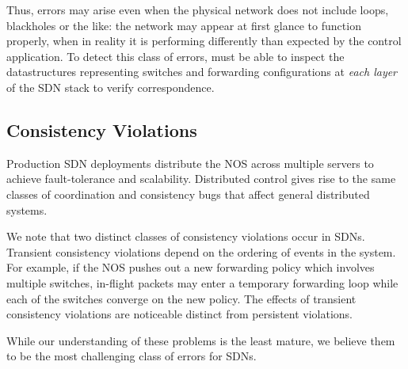 Thus, errors may arise even when the physical network does not include loops, blackholes or the like: the network
may appear at first glance to function properly, when in reality it is performing differently than expected by the control application.
To detect this class of errors, \projectname{} must be able to inspect the datastructures representing switches and forwarding configurations at {\it each layer} of the SDN stack to verify correspondence.

\subsection{Consistency Violations}
\label{sec:consistency}
Production SDN deployments distribute the NOS
 across multiple servers to achieve fault-tolerance
and scalability. Distributed control gives rise to the same classes of coordination
and consistency bugs that affect general distributed systems. 

We note that two distinct classes of consistency violations occur in SDNs.
Transient consistency violations depend on the ordering of events in the system. For example,
if the  NOS pushes out a new forwarding policy
which involves multiple switches, in-flight packets may enter a
temporary forwarding loop while each of the switches converge on the new policy.
The effects of transient
consistency violations are noticeable distinct from persistent violations.

While our understanding of these problems is the least mature, we believe them to be the most
challenging class of errors for SDNs.






